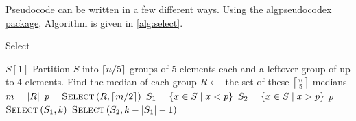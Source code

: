 Pseudocode can be written in a few different ways. Using the \href{https://ctan.org/pkg/algpseudocodex}{algpseudocodex package}, Algorithm  is given in \cref{alg:select}.

\begin{algorithm}
    \caption{Select}
    \label{alg:select}
    \begin{algorithmic}[1]
        \State \Return $S[1]$
        \EndIf
        \State Partition $S$ into $\left\lceil n/5\right\rceil$ groups of 5 elements each and a leftover group of up to 4 elements. \label{line:selectpartition}
        \State Find the median of each group \label{line:selectfindmedians}
        \State $R \gets$ the set of these $\left\lceil\frac{n}{5}\right\rceil$ medians \label{line:selectsetofmedians}
        \State $m = \left\lvert R\right\rvert$
        \State $p\gets \Call{Select}{R,\ceil{\sfrac{m}{2}}}$\label{line:selectmedianofmedians}
        \State $S_1 = \left\lbrace x\in S \mid x < p\right\rbrace$\label{line:selectleftpartition}
        \State $S_2 = \left\lbrace x\in S \mid x > p\right\rbrace$\label{line:selectrightpartition}
        \State \Return $p$
        \State \Return $\Call{Select}{S_1 ,k}$
        \Else
        \State \Return $\Call{Select}{S_2,k-\card{S_1}-1}$
        \EndIf
        \EndFunction
    \end{algorithmic}
\end{algorithm}

